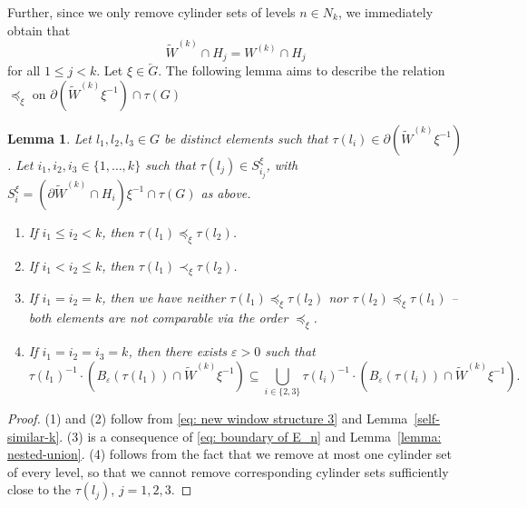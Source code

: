 \documentclass[titlepage,reqno,10pt]{amsart}
\newtheorem{lemma}[theorem]{Lemma}
\theoremstyle{definition}
\newcommand{\kl}{\left(}
\newcommand{\kr}{\right)}
\begin{document}
Further, since we only remove cylinder sets of levels $n\in N_k$,  we immediately obtain that 
\begin{equation}\label{eq: new window structure 3}
\widetilde{W}^{(k)} \cap H_j  =  W^{(k)}\cap H_j
\end{equation}
for all $1\leq j < k$. 
Let $\xi\in \overleftarrow{G}$.
The following lemma aims to describe the relation $\preccurlyeq_\xi$ on $\partial(\widetilde{W}^{(k)}\xi^{-1})\cap \tau(G)$
\begin{lemma}\label{lem: order structure tilde(W)}
    Let $l_1,l_2,l_3\in G$ be distinct elements such that $\tau(l_i)\in \partial (\widetilde{W}^{(k)}\xi^{-1})$.
    Let $i_1,i_2,i_3\in \{1,\ldots,k\}$ such that $\tau(l_j)\in S_{i_j}^\xi$, with $S_i^\xi = (\partial \widetilde{W}^{(k)}\cap H_i)\xi^{-1}\cap \tau(G)$ as above.
    \begin{enumerate}
        \item If $i_1\leq i_2<k$, then $\tau(l_1)\preccurlyeq_\xi \tau(l_2)$.
        \item If $i_1<i_2\leq k$, then $\tau(l_1)\prec_\xi \tau(l_2)$.
        \item If $i_1=i_2 =k$, then we have neither $\tau(l_1)\preccurlyeq_\xi \tau(l_2)$ nor $\tau(l_2)\preccurlyeq_\xi \tau(l_1)$ -- both elements are not comparable via the order $\preccurlyeq_\xi$.
        \item If $i_1=i_2=i_3=k$, then there exists $\varepsilon>0$ such that
        $$
        \tau(l_1)^{-1}\cdot\left(B_\varepsilon(\tau(l_1))\cap \widetilde{W}^{(k)} \xi^{-1}\right) 
        \subseteq \bigcup_{i\in\{2,3\}}\tau(l_i)^{-1} \cdot\kl B_{\varepsilon}(\tau(l_i))\cap \widetilde{W}^{(k)}\xi^{-1}\kr.$$
    \end{enumerate}
\end{lemma}
\begin{proof}
    (1) and (2) follow from \eqref{eq: new window structure 3} and Lemma~\ref{self-similar-k}.
    (3) is a consequence of \eqref{eq: boundary of E_n} and Lemma~\ref{lemma: nested-union}.
    (4) follows from the fact that we remove at most one cylinder set of every level, so that we cannot remove corresponding cylinder sets sufficiently close to the $\tau(l_j)$, $j=1,2,3$.
\end{proof}
\end{document}
